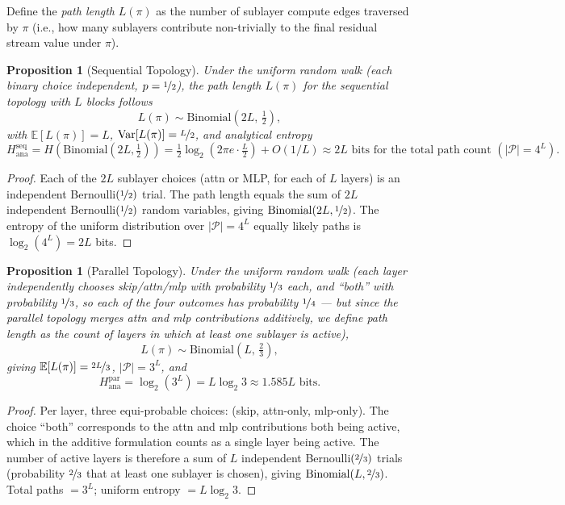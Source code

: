 \documentclass{article}
\newtheorem{proposition}[theorem]{Proposition}
\newcommand{\E}{\mathbb{E}}
\newcommand{\Pcal}{\mathcal{P}}
\newcommand{\Hana}{H_{\mathrm{ana}}}
\begin{document}
Define the \emph{path length} $L(\pi)$ as the number of sublayer compute edges
traversed by $\pi$ (i.e., how many sublayers contribute non-trivially to the
final residual stream value under $\pi$).

\begin{proposition}[Sequential Topology]
\label{prop:sequential}
Under the uniform random walk (each binary choice independent, $p=\nicefrac{1}{2}$),
the path length $L(\pi)$ for the sequential topology with $L$ blocks follows
\[
  L(\pi) \sim \mathrm{Binomial}(2L,\,\tfrac{1}{2}),
\]
with $\E[L(\pi)] = L$, $\mathrm{Var}[L(\pi)] = \nicefrac{L}{2}$,
and analytical entropy
\[
  \Hana^{\mathrm{seq}} = H(\mathrm{Binomial}(2L,\tfrac{1}{2}))
  = \tfrac{1}{2}\log_2(2\pi e \cdot \tfrac{L}{2}) + O(1/L)
  \approx 2L \text{ bits for the total path count } (|\Pcal|=4^L).
\]
\end{proposition}

\begin{proof}
Each of the $2L$ sublayer choices (attn or MLP, for each of $L$ layers) is an
independent Bernoulli$(\nicefrac{1}{2})$ trial.  The path length equals the
sum of $2L$ independent Bernoulli$(\nicefrac{1}{2})$ random variables, giving
$\mathrm{Binomial}(2L, \nicefrac{1}{2})$.  The entropy of the uniform distribution
over $|\Pcal| = 4^L$ equally likely paths is $\log_2(4^L) = 2L$ bits.
\end{proof}

\begin{proposition}[Parallel Topology]
\label{prop:parallel}
Under the uniform random walk (each layer independently chooses skip/attn/mlp with
probability $\nicefrac{1}{3}$ each, and ``both'' with probability $\nicefrac{1}{3}$,
so each of the four outcomes has probability $\nicefrac{1}{4}$ — but since the parallel
topology merges attn and mlp contributions additively, we define path length as the
count of \emph{layers} in which at least one sublayer is active),
\[
  L(\pi) \sim \mathrm{Binomial}(L,\,\tfrac{2}{3}),
\]
giving $\E[L(\pi)] = \nicefrac{2L}{3}$, $|\Pcal| = 3^L$, and
\[
  \Hana^{\mathrm{par}} = \log_2(3^L) = L\log_2 3 \approx 1.585L \text{ bits}.
\]
\end{proposition}

\begin{proof}
Per layer, three equi-probable choices: (skip, attn-only, mlp-only).  The choice
``both'' corresponds to the attn and mlp contributions both being active, which in
the additive formulation counts as a single layer being active.  The number of active
layers is therefore a sum of $L$ independent Bernoulli$(\nicefrac{2}{3})$ trials
(probability $\nicefrac{2}{3}$ that at least one sublayer is chosen), giving
$\mathrm{Binomial}(L, \nicefrac{2}{3})$.  Total paths $= 3^L$; uniform entropy
$= L\log_2 3$.
\end{proof}
\end{document}
